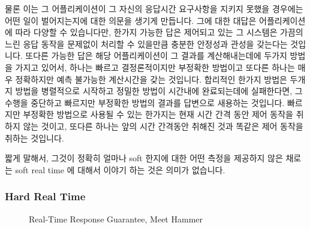 물론 이는 그 어플리케이션이 그 자신의 응답시간 요구사항을 지키지 못했을
경우에는 어떤 일이 벌어지는지에 대한 의문을 생기게 만듭니다.
그에 대한 대답은 어플리케이션에 따라 다양할 수 있습니다만, 한가지 가능한 답은
제어되고 있는 그 시스템은 가끔의 느린 응답 동작을 문제없이 처리할 수 있을만큼
충분한 안정성과 관성을 갖는다는 것입니다.
또다른 가능한 답은 해당 어플리케이션이 그 결과를 계산해내는데에 두가지 방법을
가지고 있어서, 하나는 빠르고 결정론적이지만 부정확한 방법이고 또다른 하나는
매우 정확하지만 예측 불가능한 계산시간을 갖는 것입니다.
합리적인 한가지 방법은 두개지 방법을 병렬적으로 시작하고 정밀한 방법이 시간내에
완료되는데에 실패한다면, 그 수행을 중단하고 빠르지만 부정확한 방법의 결과를
답변으로 새용하는 것입니다.
빠르지만 부정확한 방법으로 사용될 수 있는 한가지는 현재 시간 간격 동안 제어
동작을 취하지 않는 것이고, 또다른 하나는 앞의 시간 간격동안 취해진 것과 똑같은
제어 동작을 취하는 것입니다.

짧게 말해서, 그것이 정확히 얼마나 soft 한지에 대한 어떤 측정을 제공하지 않은
채로는 soft real time 에 대해서 이야기 하는 것은 의미가 없습니다.

\subsubsection{Hard Real Time}
\label{sec:Hard Real Time}

\begin{figure}[bt]
\centering
{}
\caption{Real-Time Response Guarantee, Meet Hammer}
\end{figure}

